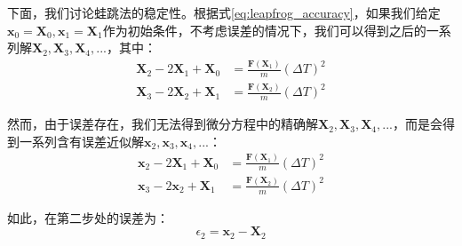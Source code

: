 {下面，我们讨论蛙跳法的稳定性。根据式\ref{eq:leapfrog_accuracy}，如果我们给定$\mathbf{x}_0 = \mathbf{X}_0,\mathbf{x}_1 = \mathbf{X}_1$作为初始条件，不考虑误差的情况下，我们可以得到之后的一系列解$\mathbf{X}_2,\mathbf{X}_3,\mathbf{X}_4,...$，其中：
      \begin{align}
         \label{eq:leapfrog_stability1}
         \mathbf{X}_{2}-2\mathbf{X}_{1}+\mathbf{X}_{0} &= \frac{\mathbf{F}(\mathbf{X}_1)}{m} {(\Delta T)^2} \\
         \label{eq:leapfrog_stability2}
         \mathbf{X}_{3}-2\mathbf{X}_{2}+\mathbf{X}_{1} &= \frac{\mathbf{F}(\mathbf{X}_2)}{m} {(\Delta T)^2}
      \end{align}

然而，由于误差存在，我们无法得到微分方程中的精确解$\mathbf{X}_2,\mathbf{X}_3,\mathbf{X}_4,...$，而是会得到一系列含有误差近似解$\mathbf{x}_2,\mathbf{x}_3,\mathbf{x}_4,...$：
      \begin{align}
         \label{eq:leapfrog_stability3}
         \mathbf{x}_{2}-2\mathbf{X}_{1}+\mathbf{X}_{0} &= \frac{\mathbf{F}(\mathbf{X}_1)}{m} {(\Delta T)^2} \\
         \label{eq:leapfrog_stability4}
         \mathbf{x}_{3}-2\mathbf{x}_{2}+\mathbf{X}_{1} &= \frac{\mathbf{F}(\mathbf{X}_2)}{m} {(\Delta T)^2}
      \end{align}

如此，在第二步处的误差为：
      \begin{equation}
         \label{eq:leapfrog_stability5}
         {\epsilon}_2 = \mathbf{x}_2 -\mathbf{X}_2
      \end{equation}

}
